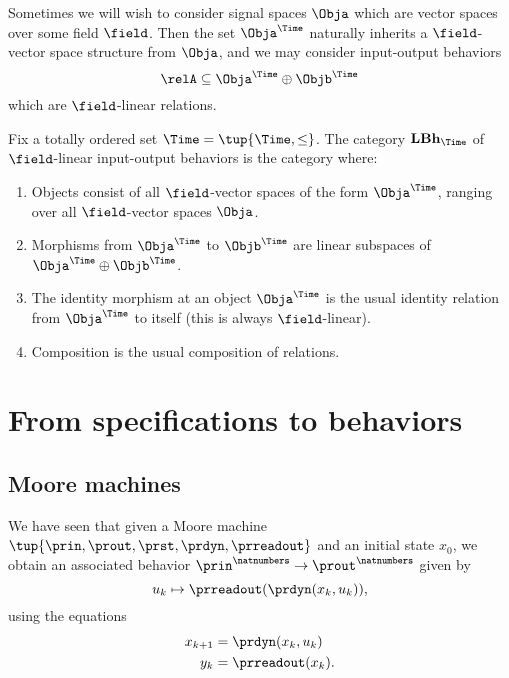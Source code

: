 Sometimes we will wish to consider signal spaces $\Obja$ which are vector spaces over some field $\field$.
Then the set $\Obja^\Time$ naturally inherits a $\field$-vector space structure from $\Obja$, and we may consider input-output behaviors
\begin{equation*}
    \relA \subseteq \Obja^\Time \oplus \Objb^\Time
\end{equation*}
which are $\field$-linear relations.

\begin{definition}
    Fix a totally ordered set $\Time = \tup{\Time, \leq}$.
    The category $\textbf{LBh}_\Time$ of $\field$-linear input-output behaviors is the category where:
    \begin{enumerate}
        \item Objects consist of all $\field$-vector spaces of the form $\Obja^\Time$, ranging over all $\field$-vector spaces $\Obja$.
        \item Morphisms from $\Obja^\Time$ to $\Objb^\Time$ are linear subspaces of  $\Obja^\Time \oplus \Objb^\Time$.
        \item The identity morphism at an object $\Obja^\Time$ is the usual identity relation from $\Obja^\Time$ to itself (this is always $\field$-linear).
        \item Composition is the usual composition of relations.
    \end{enumerate}
\end{definition}

\section{From specifications to behaviors}


\subsection{Moore machines}

We have seen that given a Moore machine $\tup{\prin, \prout, \prst, \prdyn, \prreadout}$ and an initial state $x_0$, we obtain an associated behavior $\prin^\natnumbers \to  \prout^\natnumbers$ given by
\begin{equation}
    u_k \mapsto \prreadout(\prdyn(x_k, u_k)),
\end{equation}
using the equations
\begin{align}
    x_{k+1} & = \prdyn(x_k, u_k) \\
    y_{k}   & = \prreadout(x_{k}).
\end{align}

